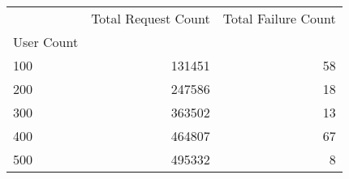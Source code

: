 \begin{tabular}{lrr}
\toprule
 & Total Request Count & Total Failure Count \\
User Count &  &  \\
\midrule
100 & 131451 & 58 \\
200 & 247586 & 18 \\
300 & 363502 & 13 \\
400 & 464807 & 67 \\
500 & 495332 & 8 \\
\bottomrule
\end{tabular}
